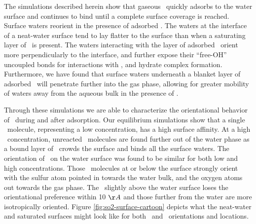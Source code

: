 The simulations described herein show that gaseous \suldiox~quickly adsorbs to the water surface and continues to bind until a complete surface coverage is reached. Surface waters reorient in the presence of adsorbed \suldiox. The waters at the interface of a neat-water surface tend to lay flatter to the surface than when a saturating layer of \suldiox~is present. The waters interacting with the layer of adsorbed \suldiox~orient more perpendicularly to the interface, and further expose their ``free-OH'' uncoupled bonds for interactions with \suldiox, and hydrate complex formation. Furthermore, we have found that surface waters underneath a blanket layer of adsorbed \suldiox~will penetrate further into the gas phase, allowing for greater mobility of waters away from the aqueous bulk in the presence of \suldiox.

Through these simulations we are able to characterize the orientational behavior of \suldiox~during and after adsorption. Our equilibrium simulations show that a single \suldiox~molecule, representing a low concentration, has a high surface affinity. At a high \suldiox~concentration, unreacted \suldiox~molecules are found further out of the water phase as a bound layer of \suldiox~crowds the surface and binds all the surface waters. The orientation of \suldiox~on the water surface was found to be similar for both low and high concentrations. Those \suldiox~molecules at or below the surface strongly orient with the sulfur atom pointed in towards the water bulk, and the oxygen atoms out towards the gas phase. The \suldiox~slightly above the water surface loses the orientational preference within 10 $\AA$ and those further from the water are more isotropically oriented. Figure \ref{fig:so2-surface-cartoon} depicts what the neat-water and saturated surfaces might look like for both \suldiox~and \wat~orientations and locations.

